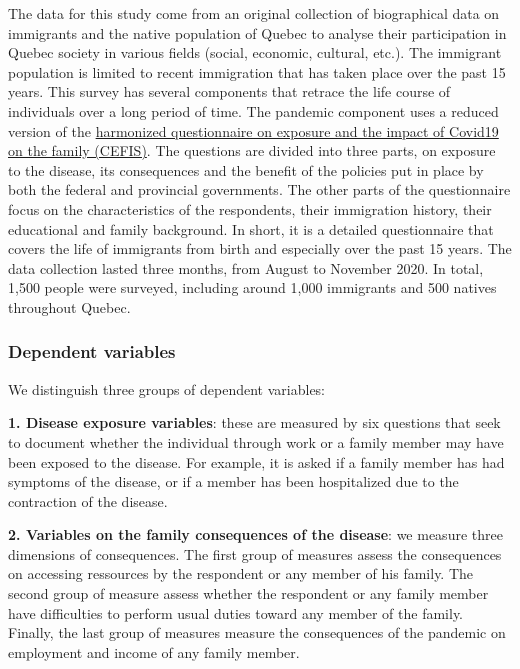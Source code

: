 \documentclass[
]{article}
\begin{document}
The data for this study come from an original collection of biographical data on
immigrants and the native population of Quebec to analyse their participation in
Quebec society in various fields (social, economic, cultural, etc.). The
immigrant population is limited to recent immigration that has taken place over
the past 15 years. This survey has several components that retrace the life
course of individuals over a long period of time. The pandemic component uses a
reduced version of the \href{https://www.phenxtoolkit.org/toolkit_content/PDF/CPTS_CEFIS_FullSurveyEng.pdf}{harmonized questionnaire on exposure and the impact of
Covid19 on the family
(CEFIS)}.
The questions are divided into three parts, on exposure to the disease, its
consequences and the benefit of the policies put in place by both the federal
and provincial governments. The other parts of the questionnaire focus on the
characteristics of the respondents, their immigration history, their educational
and family background. In short, it is a detailed questionnaire that covers the
life of immigrants from birth and especially over the past 15 years. The data
collection lasted three months, from August to November 2020. In total, 1,500
people were surveyed, including around 1,000 immigrants and 500 natives
throughout Quebec.

\hypertarget{dependent-variables-1}{%
\subsubsection{Dependent variables}\label{dependent-variables-1}}

We distinguish three groups of dependent variables:

\textbf{1. Disease exposure variables}: these are measured by six questions that seek
to document whether the individual through work or a family member may have been
exposed to the disease. For example, it is asked if a family member has had
symptoms of the disease, or if a member has been hospitalized due to the
contraction of the disease.

\textbf{2. Variables on the family consequences of the disease}: we measure three
dimensions of consequences. The first group of measures assess the consequences
on accessing ressources by the respondent or any member of his family. The
second group of measure assess whether the respondent or any family member have
difficulties to perform usual duties toward any member of the family. Finally,
the last group of measures measure the consequences of the pandemic on
employment and income of any family member.
\end{document}
